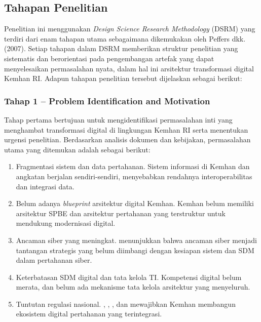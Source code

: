 \subsection{Tahapan Penelitian}
Penelitian ini menggunakan \textit{Design Science Research Methodology} (DSRM) yang terdiri dari enam tahapan utama sebagaimana dikemukakan oleh Peffers dkk. (2007).
Setiap tahapan dalam DSRM memberikan struktur penelitian yang sistematis dan berorientasi pada pengembangan artefak yang dapat menyelesaikan permasalahan nyata, dalam hal ini arsitektur transformasi digital Kemhan RI.
Adapun tahapan penelitian tersebut dijelaskan sebagai berikut:

\subsubsection{Tahap 1 – Problem Identification and Motivation}
Tahap pertama bertujuan untuk mengidentifikasi permasalahan inti yang menghambat transformasi digital di lingkungan Kemhan RI serta menentukan urgensi penelitian.
Berdasarkan analisis dokumen dan kebijakan, permasalahan utama yang ditemukan adalah sebagai berikut:
\begin{enumerate}
  \item Fragmentasi sistem dan data pertahanan.
  Sistem informasi di Kemhan dan angkatan berjalan sendiri-sendiri, menyebabkan rendahnya interoperabilitas dan integrasi data.
  \item Belum adanya \textit{blueprint} arsitektur digital Kemhan.
  Kemhan belum memiliki arsitektur SPBE dan arsitektur pertahanan yang terstruktur untuk mendukung modernisasi digital.
  \item Ancaman siber yang meningkat.
  \textcite{KemhanRI2014} menunjukkan bahwa ancaman siber menjadi tantangan strategis yang belum diimbangi dengan kesiapan sistem dan SDM dalam pertahanan siber.
  \item Keterbatasan SDM digital dan tata kelola TI.
  Kompetensi digital belum merata, dan belum ada mekanisme tata kelola arsitektur yang menyeluruh.
  \item Tuntutan regulasi nasional.
  \textcite{KementerianKomunikasidanInformatika2018}, \textcite{RepublikIndonesia2023}, \textcite{RI2019}, dan \textcite{RPJPN2025} mewajibkan Kemhan membangun ekosistem digital pertahanan yang terintegrasi.
\end{enumerate}

